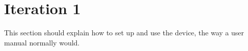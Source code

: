 \chapter{Iteration 1}

This section should explain how to set up and use the device, the way a user manual normally would.
